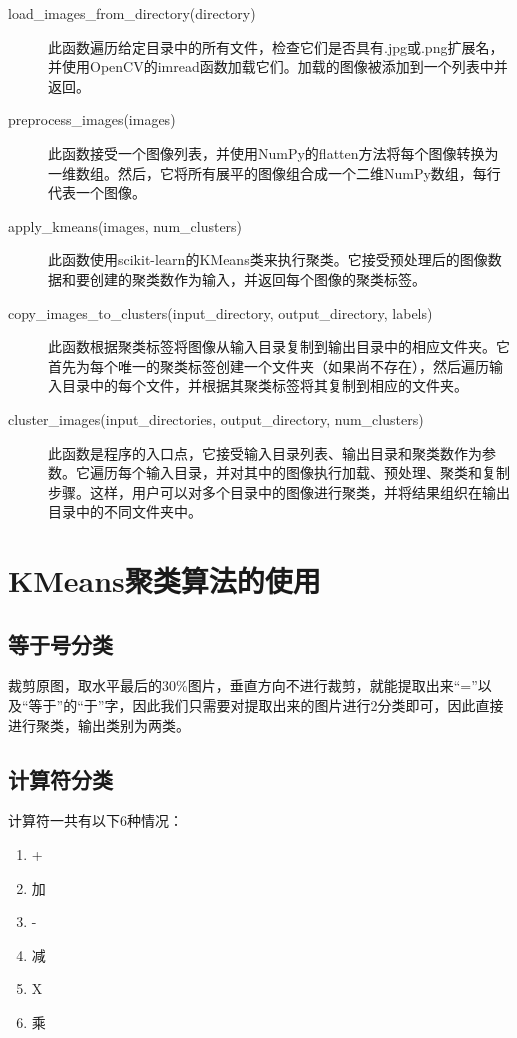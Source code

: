 \begin{description}
	\item[load\_images\_from\_directory(directory)]
	此函数遍历给定目录中的所有文件，检查它们是否具有.jpg或.png扩展名，并使用OpenCV的imread函数加载它们。加载的图像被添加到一个列表中并返回。

	\item[preprocess\_images(images)]
	此函数接受一个图像列表，并使用NumPy的flatten方法将每个图像转换为一维数组。然后，它将所有展平的图像组合成一个二维NumPy数组，每行代表一个图像。

	\item[apply\_kmeans(images, num\_clusters)]
	此函数使用scikit-learn的KMeans类来执行聚类。它接受预处理后的图像数据和要创建的聚类数作为输入，并返回每个图像的聚类标签。

	\item[copy\_images\_to\_clusters(input\_directory, output\_directory, labels)]
	此函数根据聚类标签将图像从输入目录复制到输出目录中的相应文件夹。它首先为每个唯一的聚类标签创建一个文件夹（如果尚不存在），然后遍历输入目录中的每个文件，并根据其聚类标签将其复制到相应的文件夹。

	\item[cluster\_images(input\_directories, output\_directory, num\_clusters)]
	此函数是程序的入口点，它接受输入目录列表、输出目录和聚类数作为参数。它遍历每个输入目录，并对其中的图像执行加载、预处理、聚类和复制步骤。这样，用户可以对多个目录中的图像进行聚类，并将结果组织在输出目录中的不同文件夹中。
\end{description}

\section{KMeans聚类算法的使用}

\subsection{等于号分类}

裁剪原图，取水平最后的30\%图片，垂直方向不进行裁剪，就能提取出来“=”以及“等于”的“于”字，因此我们只需要对提取出来的图片进行2分类即可，因此直接进行聚类，输出类别为两类。

\subsection{计算符分类}

计算符一共有以下6种情况：

\begin{enumerate}
	\item +
	\item 加
	\item -
	\item 减
	\item X
	\item 乘
\end{enumerate}

